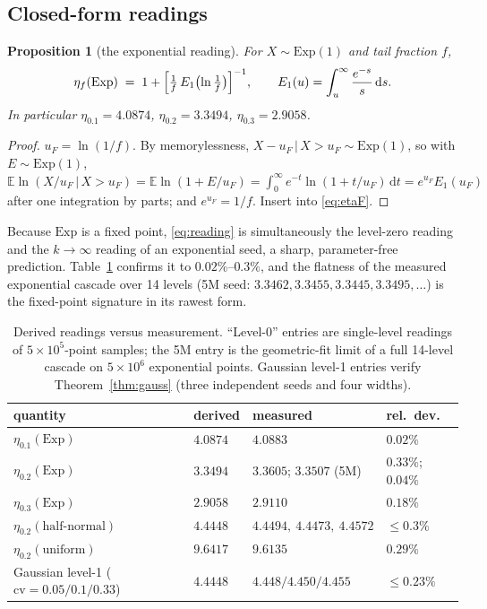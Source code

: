\documentclass[11pt,a4paper]{article}
\newtheorem{proposition}{Proposition}
\theoremstyle{remark}
\newcommand{\Exp}{\mathrm{Exp}}
\newcommand{\cv}{\mathrm{cv}}
\newcommand{\dd}{\,\mathrm{d}}
\begin{document}
\subsection{Closed-form readings}

\begin{proposition}[the exponential reading]\label{prop:reading}
For $X \sim \Exp(1)$ and tail fraction $f$,
\begin{equation}\label{eq:reading}
\eta_f(\Exp) \;=\; 1 + \Bigl[\tfrac1f\,E_1\bigl(\ln \tfrac1f\bigr)\Bigr]^{-1},
\qquad E_1(u) = \int_u^\infty \frac{e^{-s}}{s}\dd s .
\end{equation}
In particular $\eta_{0.1} = 4.0874$, $\eta_{0.2} = 3.3494$, $\eta_{0.3} = 2.9058$.
\end{proposition}

\begin{proof}
$u_F = \ln(1/f)$. By memorylessness, $X-u_F \,|\, X>u_F \sim \Exp(1)$, so with $E \sim \Exp(1)$,
$\mathbb{E}\ln(X/u_F \,|\, X>u_F) = \mathbb{E}\ln(1+E/u_F) = \int_0^\infty e^{-t}\ln(1+t/u_F)\dd t
= e^{u_F}E_1(u_F)$ after one integration by parts; and $e^{u_F} = 1/f$. Insert into
\eqref{eq:etaF}.
\end{proof}

Because $\Exp$ is a fixed point, \eqref{eq:reading} is simultaneously the level-zero reading and the
$k\to\infty$ reading of an exponential seed, a sharp, parameter-free prediction. Table~\ref{tab:analytic}
confirms it to $0.02\%$--$0.3\%$, and the flatness of the measured exponential cascade over 14 levels
(5M seed: $3.3462, 3.3455, 3.3445, 3.3495, \dots$) is the fixed-point signature in its rawest form.

\begin{table}[t]
\centering\small
\caption{Derived readings versus measurement. ``Level-0'' entries are single-level readings of
$5\times10^{5}$-point samples; the 5M entry is the geometric-fit limit of a full 14-level cascade on
$5\times10^{6}$ exponential points. Gaussian level-1 entries verify Theorem~\ref{thm:gauss}
(three independent seeds and four widths).}
\label{tab:analytic}
\begin{tabular}{llll}
\toprule
quantity & derived & measured & rel.\ dev.\\
\midrule
$\eta_{0.1}(\Exp)$ & $4.0874$ & $4.0883$ & $0.02\%$\\
$\eta_{0.2}(\Exp)$ & $3.3494$ & $3.3605$; $3.3507$ (5M) & $0.33\%$; $0.04\%$\\
$\eta_{0.3}(\Exp)$ & $2.9058$ & $2.9110$ & $0.18\%$\\
$\eta_{0.2}(\text{half-normal})$ & $4.4448$ & $4.4494,\ 4.4473,\ 4.4572$ & $\le 0.3\%$\\
$\eta_{0.2}(\text{uniform})$ & $9.6417$ & $9.6135$ & $0.29\%$\\
Gaussian level-1 ($\cv = 0.05/0.1/0.33$) & $4.4448$ & $4.448/4.450/4.455$ & $\le 0.23\%$\\
\bottomrule
\end{tabular}
\end{table}
\end{document}
